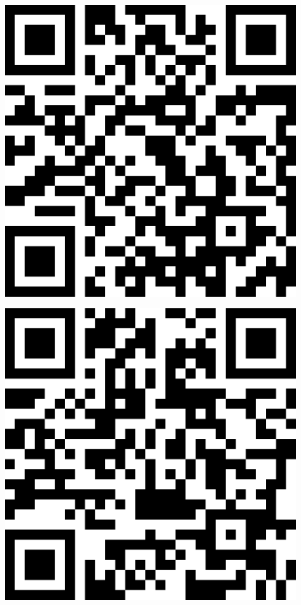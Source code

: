 \documentclass[letterpaper]{article}
\begin{document}
 \endgroup 
 \vspace*{\fill} 
 \pagebreak 
{} 
 \vspace*{\fill} 
 \begingroup 
 \centerline{\includegraphics[scale=1,width=5in,height=5in]{PatternLab.png}} 
 \endgroup 
 \vspace*{\fill} 
 \pagebreak 
{} 
 \vspace*{\fill} 
 \begingroup 
 \centerline{\includegraphics[scale=1,width=5in,height=5in]{RNDLab.png}} 
\end{document}
